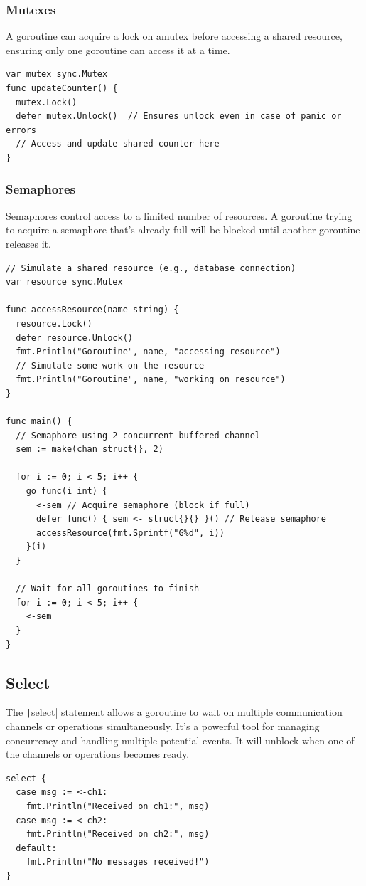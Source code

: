 \documentclass[letterpaper,12pt]{article}
\begin{document}
\subsubsection*{Mutexes}
A goroutine can acquire a lock on amutex before accessing a shared resource, ensuring only one goroutine can access it at a time.
\begin{verbatim}
var mutex sync.Mutex
func updateCounter() {
  mutex.Lock()
  defer mutex.Unlock()  // Ensures unlock even in case of panic or errors
  // Access and update shared counter here
}
\end{verbatim}

\subsubsection*{Semaphores}
Semaphores control access to a limited number of resources. A goroutine trying to acquire a semaphore that's already full will be blocked until another goroutine releases it.
\begin{verbatim}
// Simulate a shared resource (e.g., database connection)
var resource sync.Mutex

func accessResource(name string) {
  resource.Lock()
  defer resource.Unlock()
  fmt.Println("Goroutine", name, "accessing resource")
  // Simulate some work on the resource
  fmt.Println("Goroutine", name, "working on resource")
}

func main() {
  // Semaphore using 2 concurrent buffered channel
  sem := make(chan struct{}, 2) 

  for i := 0; i < 5; i++ {
    go func(i int) {
      <-sem // Acquire semaphore (block if full)
      defer func() { sem <- struct{}{} }() // Release semaphore
      accessResource(fmt.Sprintf("G%d", i))
    }(i)
  }

  // Wait for all goroutines to finish
  for i := 0; i < 5; i++ {
    <-sem
  }
}
\end{verbatim}
\subsection{Select}
The \texttt|select| statement allows a goroutine to wait on multiple communication channels or operations simultaneously. It's a powerful tool for managing concurrency and handling multiple potential events. It will unblock when one of the channels or operations becomes ready.
\begin{verbatim}
select {
  case msg := <-ch1:
    fmt.Println("Received on ch1:", msg)
  case msg := <-ch2:
    fmt.Println("Received on ch2:", msg)
  default:
    fmt.Println("No messages received!")
}
\end{verbatim}
\end{document}
